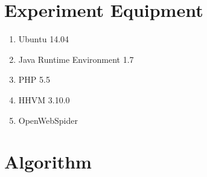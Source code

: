 \begin{appendices}



\chapter{Experiment Equipment}
\begin{enumerate}
\item Ubuntu 14.04
\item Java Runtime Environment 1.7
\item PHP 5.5
\item HHVM 3.10.0
\item OpenWebSpider
\end{enumerate}

\chapter{Algorithm}
\label{appendix:algorithm}



\end{appendices}